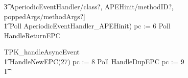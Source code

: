 \begin{figure}[t!]
\begin{circus}
    \t3 AperiodicEventHandler/class?, APEHinit/methodID?, poppedArgs/methodArgs?] \rschexpract \circseq \\
    \t1 Poll \circseq AperiodicEventHandler\_APEHinit) \circseq pc := 6 \circseq Poll \circseq HandleReturnEPC
  \end{circus}
  \vspace{-1cm}
  \begin{circus}
    TPK\_handleAsyncEvent \circdef \\
    \t1 HandleNewEPC(27) \circseq pc := 8 \circseq Poll \circseq HandleDupEPC \circseq pc := 9 \circseq \\
    \t1 {} \cdots {} \\

\end{circus}
\end{figure}
